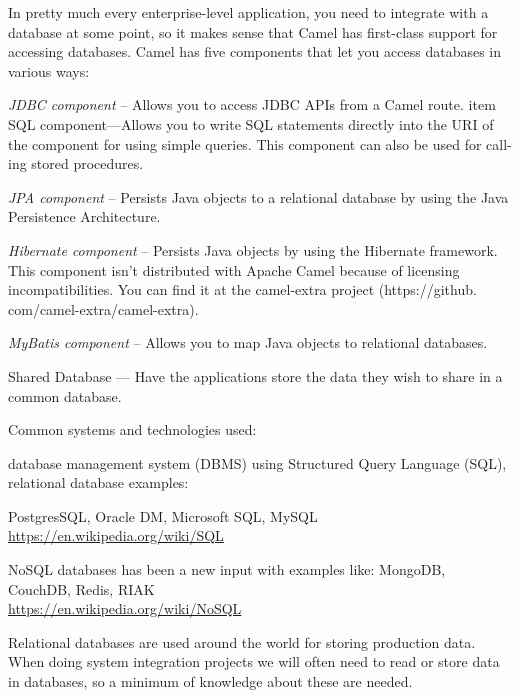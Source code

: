 \documentclass[Screen16to9,17pt]{foils}
\begin{document}
In pretty much every enterprise-­level application, you need to integrate with a database at some point, so it makes sense that Camel has first-­class support for accessing databases. Camel has five components that let you access databases in various ways:
\begin{list2}
\item \emph{JDBC component} -- Allows you to access JDBC APIs from a Camel route.
item SQL component—Allows you to write SQL statements directly into the URI of the
component for using simple queries. This component can also be used for call-
ing stored procedures.
\item \emph{JPA component} -- Persists Java objects to a relational database by using the Java Persistence Architecture.
\item \emph{Hibernate component} -- Persists Java objects by using the Hibernate framework.
This component isn’t distributed with Apache Camel because of licensing
incompatibilities. You can find it at the camel-­extra project (https://github.
com/camel-­extra/camel-­extra).
\item \emph{MyBatis component} -- Allows you to map Java objects to relational databases.
\end{list2}




Shared Database — Have the applications store the data they wish to share in a common database.

Common systems and technologies used:
\begin{list2}
\item database management system (DBMS) using Structured Query Language (SQL), relational database examples:\\
\item PostgresSQL, Oracle DM, Microsoft SQL, MySQL
\url{https://en.wikipedia.org/wiki/SQL}
\item NoSQL databases has been a new input with examples like:
MongoDB, CouchDB, Redis, RIAK\\
\url{https://en.wikipedia.org/wiki/NoSQL}
\end{list2}



Relational databases are used around the world for storing production data. When doing system integration projects we will often need to read or store data in databases, so a minimum of knowledge about these are needed.
\end{document}
